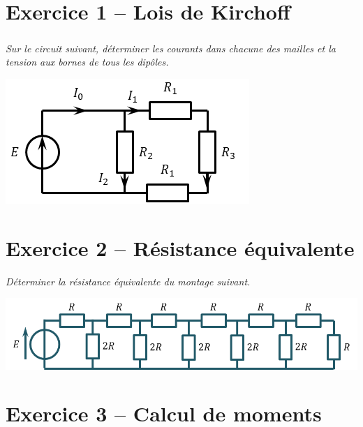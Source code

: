 \documentclass[10pt,fleqn]{article} %
\begin{document}

\vspace{5.5cm}
\pagestyle{fancy}
\thispagestyle{plain}


\def\columnseprulecolor{\color{ocre}}
\setlength{\columnseprule}{0.4pt} 

\begin{multicols}{2}
\section*{Exercice 1 -- Lois de Kirchoff}
\ifprof
\else
\fi

\subparagraph*{}
\textit{Sur le circuit suivant, déterminer les courants dans chacune des mailles et la tension aux bornes de tous les dipôles.}
\begin{center}
\includegraphics[width=\linewidth]{images/fig_02}
\end{center}


\section*{Exercice 2 -- Résistance équivalente}
\textit{Déterminer la résistance équivalente du montage suivant.}
\begin{center}
\includegraphics[width=\linewidth]{images/fig_06}
\end{center}




\section*{Exercice 3 -- Calcul de moments}


\end{multicols}
\end{document}
